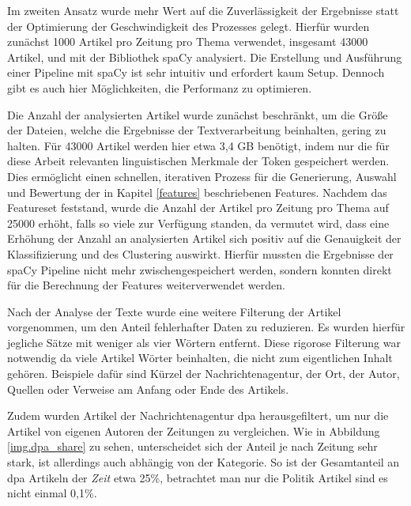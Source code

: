 Im zweiten Ansatz wurde mehr Wert auf die Zuverlässigkeit der Ergebnisse statt der Optimierung der Geschwindigkeit des Prozesses gelegt. Hierfür wurden zunächst 1000 Artikel pro Zeitung pro Thema verwendet, insgesamt 43000 Artikel, und mit der Bibliothek spaCy analysiert. Die Erstellung und Ausführung einer Pipeline mit spaCy ist sehr intuitiv und erfordert kaum Setup. Dennoch gibt es auch hier Möglichkeiten, die Performanz zu optimieren.


Die Anzahl der analysierten Artikel wurde zunächst beschränkt, um die Größe der Dateien, welche die Ergebnisse der Textverarbeitung beinhalten, gering zu halten. Für 43000 Artikel werden hier etwa 3,4 GB benötigt, indem nur die für diese Arbeit relevanten linguistischen Merkmale der Token gespeichert werden. Dies ermöglicht einen schnellen, iterativen Prozess für die Generierung, Auswahl und Bewertung der in Kapitel \ref{features} beschriebenen Features. Nachdem das Featureset feststand, wurde die Anzahl der Artikel pro Zeitung pro Thema auf 25000 erhöht, falls so viele zur Verfügung standen, da vermutet wird, dass eine Erhöhung der Anzahl an analysierten Artikel sich positiv auf die Genauigkeit der Klassifizierung und des Clustering auswirkt. Hierfür mussten die Ergebnisse der spaCy Pipeline nicht mehr zwischengespeichert werden, sondern konnten direkt für die Berechnung der Features weiterverwendet werden.

Nach der Analyse der Texte wurde eine weitere Filterung der Artikel vorgenommen, um den Anteil fehlerhafter Daten zu reduzieren. Es wurden hierfür jegliche Sätze mit weniger als vier Wörtern entfernt. Diese rigorose Filterung war notwendig da viele Artikel Wörter beinhalten, die nicht zum eigentlichen Inhalt gehören. Beispiele dafür sind Kürzel der Nachrichtenagentur, der Ort, der Autor, Quellen oder Verweise am Anfang oder Ende des Artikels.


Zudem wurden Artikel der Nachrichtenagentur dpa herausgefiltert, um nur die Artikel von eigenen Autoren der Zeitungen zu vergleichen. Wie in Abbildung \ref{img.dpa_share} zu sehen, unterscheidet sich der Anteil je nach Zeitung sehr stark, ist allerdings auch abhängig von der Kategorie. So ist der Gesamtanteil an dpa Artikeln der \emph{Zeit} etwa 25\%, betrachtet man nur die Politik Artikel sind es nicht einmal 0,1\%.

